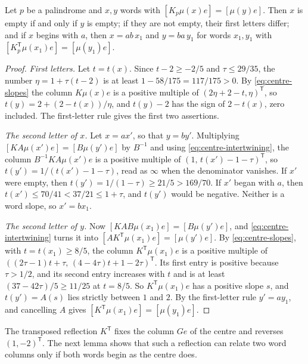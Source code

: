 \begin{lemma}
\label{lem:centre-first-letters}
Let $p$ be a palindrome and $x,y$ words with $[K_p\mu(x)e]=[\mu(y)e]$. Then $x$ is empty if and
only if $y$ is empty; if they are not empty, their first letters differ; and if $x$ begins with
$a$, then $x=ab\,x_1$ and $y=ba\,y_1$ for words $x_1,y_1$ with $[K_p^{\mathsf T}\mu(x_1)e]=[\mu(y_1)e]$.
\end{lemma}

\begin{proof}
\emph{First letters.} Let $t=t(x)$. Since $t-2\geqslant-2/5$ and $\tau\leqslant29/35$, the number
$\eta=1+\tau(t-2)$ is at least $1-58/175=117/175>0$. By \eqref{eq:centre-slopes} the column
$K\mu(x)e$ is a positive multiple of $(2\eta+2-t,\eta)^{\mathsf T}$, so
$t(y)=2+(2-t(x))/\eta$, and $t(y)-2$ has the sign of $2-t(x)$, zero included. The first-letter
rule gives the first two assertions.

\emph{The second letter of $x$.} Let $x=ax'$, so that $y=by'$. Multiplying
$[KA\mu(x')e]=[B\mu(y')e]$ by $B^{-1}$ and using \eqref{eq:centre-intertwining}, the column
$B^{-1}KA\mu(x')e$ is a positive multiple of $(1,\,t(x')-1-\tau)^{\mathsf T}$, so
$t(y')=1/(t(x')-1-\tau)$, read as $\infty$ when the denominator vanishes. If $x'$ were empty, then
$t(y')=1/(1-\tau)\geqslant21/5>169/70$. If $x'$ began with $a$, then
$t(x')\leqslant70/41<37/21\leqslant1+\tau$, and $t(y')$ would be negative. Neither is a word slope,
so $x'=bx_1$.

\emph{The second letter of $y$.} Now $[KAB\mu(x_1)e]=[B\mu(y')e]$, and
\eqref{eq:centre-intertwining} turns it into $[AK^{\mathsf T}\mu(x_1)e]=[\mu(y')e]$. By
\eqref{eq:centre-slopes}, with $t=t(x_1)\geqslant8/5$, the column $K^{\mathsf T}\mu(x_1)e$ is a
positive multiple of $((2\tau-1)t+\tau,\,(4-4\tau)t+1-2\tau)^{\mathsf T}$. Its first entry is
positive because $\tau>1/2$, and its second entry increases with $t$ and is at least
$(37-42\tau)/5\geqslant11/25$ at $t=8/5$. So $K^{\mathsf T}\mu(x_1)e$ has a positive slope $s$, and
$t(y')=A(s)$ lies strictly between $1$ and $2$. By the first-letter rule $y'=ay_1$, and cancelling
$A$ gives $[K^{\mathsf T}\mu(x_1)e]=[\mu(y_1)e]$.
\end{proof}

The transposed reflection $K^{\mathsf T}$ fixes the column $Ge$ of the centre and reverses
$(1,-2)^{\mathsf T}$. The next lemma shows that such a reflection can relate two word columns only if
both words begin as the centre does.

